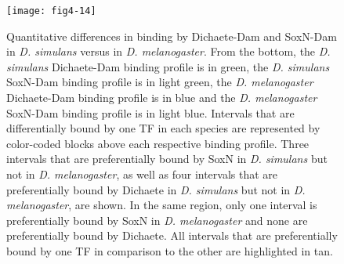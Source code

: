 \begin{figure}
\centering
\texttt{[image: fig4-14]}
\caption{Quantitative differences in binding by Dichaete-Dam and SoxN-Dam in \emph{D. simulans} versus in \emph{D. melanogaster}. From the bottom, the \emph{D. simulans} Dichaete-Dam binding profile is in green, the \emph{D. simulans} SoxN-Dam binding profile is in light green, the \emph{D. melanogaster} Dichaete-Dam binding profile is in blue and the \emph{D. melanogaster} SoxN-Dam binding profile is in light blue. Intervals that are differentially bound by one TF in each species are represented by color-coded blocks above each respective binding profile. Three intervals that are preferentially bound by SoxN in \emph{D. simulans} but not in \emph{D. melanogaster}, as well as four intervals that are preferentially bound by Dichaete in \emph{D. simulans} but not in \emph{D. melanogaster}, are shown. In the same region, only one interval is preferentially bound by SoxN in \emph{D. melanogaster} and none are preferentially bound by Dichaete. All intervals that are preferentially bound by one TF in comparison to the other are highlighted in tan.}
\label{Figure 4.14}
\end{figure}

